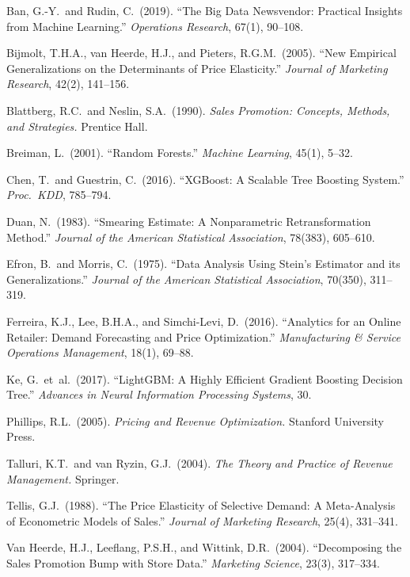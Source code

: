 \documentclass[12pt,a4paper]{article}
\begin{document}
\begin{enumerate}[label={[\arabic*]}, nosep, leftmargin=*]
\item Ban, G.-Y.\ and Rudin, C.\ (2019). ``The Big Data Newsvendor:
Practical Insights from Machine Learning.'' \textit{Operations
Research}, 67(1), 90--108.

\item Bijmolt, T.H.A., van Heerde, H.J., and Pieters, R.G.M.\
(2005). ``New Empirical Generalizations on the Determinants of Price
Elasticity.'' \textit{Journal of Marketing Research}, 42(2), 141--156.

\item Blattberg, R.C.\ and Neslin, S.A.\ (1990).
\textit{Sales Promotion: Concepts, Methods, and Strategies.}
Prentice Hall.

\item Breiman, L.\ (2001). ``Random Forests.''
\textit{Machine Learning}, 45(1), 5--32.

\item Chen, T.\ and Guestrin, C.\ (2016). ``XGBoost: A Scalable Tree
Boosting System.'' \textit{Proc.\ KDD}, 785--794.

\item Duan, N.\ (1983). ``Smearing Estimate: A Nonparametric
Retransformation Method.'' \textit{Journal of the American Statistical
Association}, 78(383), 605--610.

\item Efron, B.\ and Morris, C.\ (1975). ``Data Analysis Using
Stein's Estimator and its Generalizations.'' \textit{Journal of the
American Statistical Association}, 70(350), 311--319.

\item Ferreira, K.J., Lee, B.H.A., and Simchi-Levi, D.\ (2016).
``Analytics for an Online Retailer: Demand Forecasting and Price
Optimization.'' \textit{Manufacturing \& Service Operations
Management}, 18(1), 69--88.

\item Ke, G.\ et~al.\ (2017). ``LightGBM: A Highly Efficient
Gradient Boosting Decision Tree.'' \textit{Advances in Neural
Information Processing Systems}, 30.

\item Phillips, R.L.\ (2005). \textit{Pricing and Revenue
Optimization.} Stanford University Press.

\item Talluri, K.T.\ and van Ryzin, G.J.\ (2004). \textit{The Theory
and Practice of Revenue Management.} Springer.

\item Tellis, G.J.\ (1988). ``The Price Elasticity of Selective
Demand: A Meta-Analysis of Econometric Models of Sales.''
\textit{Journal of Marketing Research}, 25(4), 331--341.

\item Van Heerde, H.J., Leeflang, P.S.H., and Wittink, D.R.\
(2004). ``Decomposing the Sales Promotion Bump with Store Data.''
\textit{Marketing Science}, 23(3), 317--334.
\end{enumerate}
\end{document}
